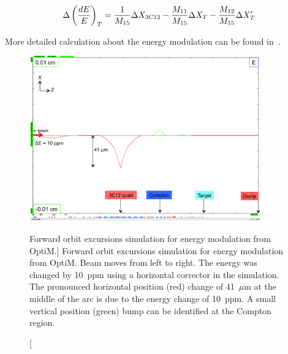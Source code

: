 \begin{equation} \label{equ:energy2}
\Delta\left(\frac{dE}{E} \right)_{T} = \frac{1}{M_{15}}\Delta X_{\rm 3C12} - \frac{M_{11}}{M_{15}}\Delta X_{T} - \frac{M_{12}}{M_{15}}\Delta X^{\prime}_{T}
\end{equation}

More detailed calculation about the energy modulation can be found in~\cite{nur_bm_energy}.

\begin{singlespace}
\begin{figure}[!h]
	\begin{center}
	\includegraphics[width=10.0cm]{figures/BModEnergy}
	\end{center}
	\caption
	[Forward orbit excursions simulation for energy modulation from OptiM.]
	{Forward orbit excursions simulation for energy modulation from OptiM. Beam moves from left to right. The energy was changed by 10~ppm using a horizontal corrector in the simulation. The pronounced horizontal position (red) change of 41~$\mu$m at the middle of the arc is due to the energy change of 10~ppm. A small vertical position (green) bump can be identified at the Compton region.}
	\label{fig:BModEnergy}
\end{figure}
\end{singlespace}



